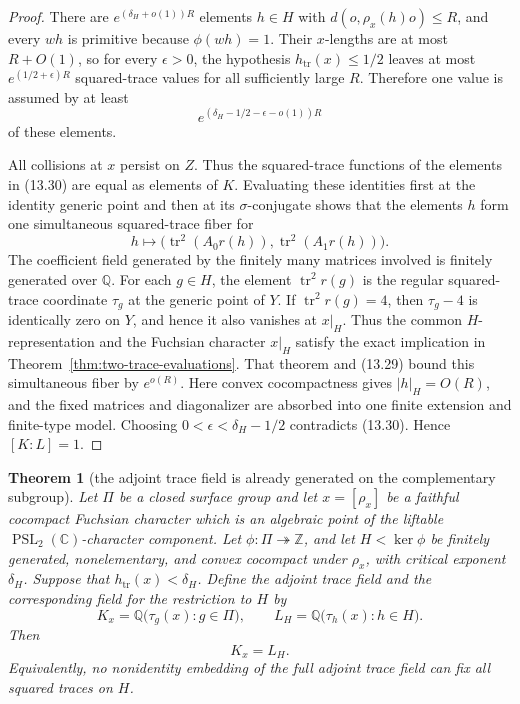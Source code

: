 \documentclass[11pt,reqno]{amsart}
\newtheorem{theorem}{Theorem}[section]
\theoremstyle{definition}
\theoremstyle{remark}
\newcommand{\C}{\mathbb C}
\newcommand{\Q}{\mathbb Q}
\newcommand{\Z}{\mathbb Z}
\newcommand{\Tr}{\operatorname{tr}}
\newcommand{\PSL}{\operatorname{PSL}}
\begin{document}
\begin{proof}
There are \(e^{(\delta_H+o(1))R}\) elements
\(h\in H\) with \(d(o,\rho_x(h)o)\le R\), and every \(wh\) is primitive
because \(\phi(wh)=1\).  Their \(x\)-lengths are at most \(R+O(1)\), so
for every \(\epsilon>0\), the hypothesis \(h_{\Tr}(x)\le1/2\) leaves at
most \(e^{(1/2+\epsilon)R}\) squared-trace values for all sufficiently
large \(R\).  Therefore one value is assumed by at least
\[
 e^{(\delta_H-1/2-\epsilon-o(1))R}
\tag{13.30}
\]
of these elements.

All collisions at \(x\) persist on \(Z\).  Thus the squared-trace functions
of the elements in (13.30) are equal as elements of \(K\).  Evaluating
these identities first at the identity generic point and then at its
\(\sigma\)-conjugate shows that the elements \(h\) form one simultaneous
squared-trace fiber for
\[
 h\longmapsto
 \bigl(\Tr^2(A_0r(h)),\Tr^2(A_1r(h))\bigr).
\]
The coefficient field generated by the finitely many matrices involved is
finitely generated over \(\Q\).  For each \(g\in H\), the element
\(\Tr^2r(g)\) is the regular squared-trace coordinate \(\tau_g\) at the
generic point of \(Y\).  If \(\Tr^2r(g)=4\), then \(\tau_g-4\) is identically
zero on \(Y\), and hence it also vanishes at \(x|_H\).  Thus the common
\(H\)-representation and the Fuchsian character \(x|_H\) satisfy the exact
implication in Theorem~\ref{thm:two-trace-evaluations}.  That theorem and
(13.29) bound
this simultaneous fiber by \(e^{o(R)}\).  Here convex cocompactness gives
\(|h|_H=O(R)\), and the fixed matrices and diagonalizer are absorbed into
one finite extension and finite-type model.  Choosing
\(0<\epsilon<\delta_H-1/2\) contradicts (13.30).  Hence \([K:L]=1\).
\end{proof}

\begin{theorem}[the adjoint trace field is already generated on the
complementary subgroup]
\label{thm:algebraic-restriction-field}
Let \(\Pi\) be a closed surface group and let \(x=[\rho_x]\) be a faithful
cocompact Fuchsian character which is an algebraic point of the liftable
\(\PSL_2(\C)\)-character component.  Let
\(\phi\colon\Pi\twoheadrightarrow\Z\), and let \(H<\ker\phi\) be finitely
generated, nonelementary, and convex cocompact under \(\rho_x\), with
critical exponent \(\delta_H\).  Suppose that
\(h_{\Tr}(x)<\delta_H\).  Define the adjoint trace field and the
corresponding field for the restriction to \(H\) by
\[
 K_x=\Q\bigl(\tau_g(x):g\in\Pi\bigr),
 \qquad
 L_H=\Q\bigl(\tau_h(x):h\in H\bigr).
\]
Then
\[
 K_x=L_H.
\]
Equivalently, no nonidentity embedding of the full adjoint trace field can
fix all squared traces on \(H\).
\end{theorem}
\end{document}
